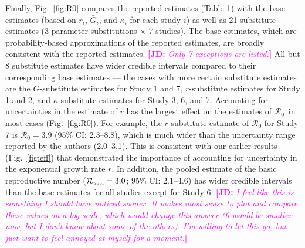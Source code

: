 \documentclass[12pt]{article}
\newcommand{\fref}[1]{Fig.~\ref{fig:#1}}
\newcommand{\Ro}{\ensuremath{{\mathcal R}_{0}}\xspace}
\newcommand{\Rpool}{\ensuremath{{\mathcal R}_{\textrm{\tiny{pool}}}}\xspace}
\newcommand{\comment}[3]{\textcolor{#1}{\textbf{[#2: }\textsl{#3}\textbf{]}}}
\newcommand{\jd}[1]{\comment{magenta}{JD}{#1}}
\begin{document}
Finally, \fref{R0} compares the reported estimates (Table 1) with the base estimates (based on $r_i$, $\bar G_i$, and $\kappa_i$ for each study $i$) as well as 21 substitute estimates (3 parameter substitutions $\times$ 7 studies).
The base estimates, which are probability-based approximations of the reported estimates, are broadly consistent with the reported estimates.
\jd{Only 7 exceptions are listed.} All but 8 substitute estimates have wider credible intervals compared to their corresponding base estimates --- the cases with more certain substitute estimates are the $\bar G$-substitute estimates for Study 1 and 7, $r$-substitute estimates for Study 1 and 2, and  $\kappa$-substitute estimates for Study 3, 6, and 7.
Accounting for uncertainties in the estimate of $r$ has the largest effect on the estimates of \Ro\ in most cases (\fref{R0}).
For example, the $r$-substitute estimate of \Ro for Study 7 is $\Ro = 3.9$ (95\% CI: 2.3--8.8), which is much wider than the uncertainty range reported by the authors (2.0--3.1).
This is consistent with our earlier results (\fref{eff}) that demonstrated the importance of accounting for uncertainty in the exponential growth rate $r$.
In addition, the pooled estimate of the basic reproductive number ($\Rpool = 3.0$; 95\% CI: 2.1--4.6) has wider credible intervals than the base estimates for all studies except for Study 6.
\jd{I feel like this is something I should have noticed sooner. It makes most sense to plot and compare these values on a log scale, which would change this answer (6 would be smaller now, but I don't know about some of the others). I'm willing to let this go, but just want to feel annoyed at myself for a moment.}
\end{document}
